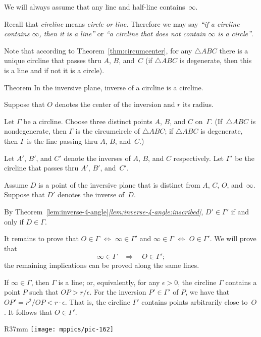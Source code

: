 We will always assume that any line and half-line contains~$\infty$. 

Recall that
\emph{circline}
means {}\emph{circle or line}.
Therefore we may say 
{}\emph{``if a circline contains $\infty$, then it is a line''} or {}\emph{``a circline that does not contain $\infty$  is a circle''}.

Note that according to Theorem~\ref{thm:circumcenter}, 
for any $\triangle ABC$ there is a unique circline that passes thru $A$, $B$, and~$C$
(if $\triangle ABC$ is degenerate, then this is a line and if not it is a circle).

\begin{thm}{Theorem}\label{thm:inverse-cline}
In the inversive plane, inverse of a circline is a circline.
\end{thm}

Suppose that $O$ denotes the center of the inversion and $r$ its radius.

Let $\Gamma$ be a circline.
Choose three distinct points $A$, $B$, and $C$ on~$\Gamma$.
(If~$\triangle ABC$ is nondegenerate, 
then $\Gamma$ is the circumcircle of $\triangle ABC$;
if $\triangle ABC$ is degenerate, 
then $\Gamma$ is the line passing thru $A$, $B$, and~$C$.)

Let $A'$, $B'$, and $C'$ denote the inverses of $A$, $B$, and $C$ respectively.
Let $\Gamma'$ be the circline that passes thru $A'$, $B'$, and~$C'$.

Assume $D$ is a point of the inversive plane that is distinct from $A$, $C$, $O$, and~$\infty$.
Suppose that $D'$ denotes the inverse of~$D$.

By Theorem~\ref{lem:inverse-4-angle}\textit{\ref{lem:inverse-4-angle:inscribed}},
$D'\in\Gamma'$ if and only if $D\in\Gamma$.

It remains to prove that 
$O\in \Gamma$ $\Leftrightarrow$ $\infty\in\Gamma'$ 
and 
$\infty\in \Gamma$ $\Leftrightarrow$ $O\in\Gamma'$.
We will prove that
$$\infty\in \Gamma
\quad
\Longrightarrow
\quad
O\in\Gamma';$$
the remaining implications can be proved along the same lines.

If $\infty\in\Gamma$, then $\Gamma$ is a line;
or, equivalently, for any $\epsilon>0$, the circline $\Gamma$ contains a point $P$ such that $OP>r/\epsilon$.
For the inversion $P'\in\Gamma'$ of $P$, we have that $OP'=r^2/OP<r\cdot \epsilon$.
That is, the circline $\Gamma'$ contains points arbitrarily close to~$O$.
It follows that $O\in \Gamma'$.
\qeds

\begin{wrapfigure}{R}{37mm}
\vskip-2mm
\centering
\texttt{[image: mppics/pic-162]}
\end{wrapfigure}

